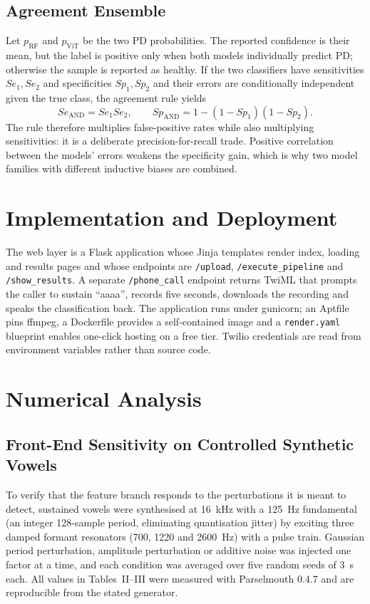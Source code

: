 \subsection{Agreement Ensemble}
Let $p_{\mathrm{RF}}$ and $p_{\mathrm{ViT}}$ be the two PD probabilities. The reported confidence is their mean, but the label is positive only when both models individually predict PD; otherwise the sample is reported as healthy. If the two classifiers have sensitivities $Se_1, Se_2$ and specificities $Sp_1, Sp_2$ and their errors are conditionally independent given the true class, the agreement rule yields
\begin{equation}
Se_{\mathrm{AND}} = Se_1 Se_2,\qquad Sp_{\mathrm{AND}} = 1-(1-Sp_1)(1-Sp_2).
\end{equation}
The rule therefore multiplies false-positive rates while also multiplying sensitivities: it is a deliberate precision-for-recall trade. Positive correlation between the models' errors weakens the specificity gain, which is why two model families with different inductive biases are combined.

\section{Implementation and Deployment}
The web layer is a Flask application whose Jinja templates render index, loading and results pages and whose endpoints are \texttt{/upload}, \texttt{/execute\_pipeline} and \texttt{/show\_results}. A separate \texttt{/phone\_call} endpoint returns TwiML that prompts the caller to sustain ``aaaa'', records five seconds, downloads the recording and speaks the classification back. The application runs under gunicorn; an Aptfile pins ffmpeg, a Dockerfile provides a self-contained image and a \texttt{render.yaml} blueprint enables one-click hosting on a free tier. Twilio credentials are read from environment variables rather than source code.

\section{Numerical Analysis}
\subsection{Front-End Sensitivity on Controlled Synthetic Vowels}
To verify that the feature branch responds to the perturbations it is meant to detect, sustained vowels were synthesised at 16~kHz with a 125~Hz fundamental (an integer 128-sample period, eliminating quantisation jitter) by exciting three damped formant resonators (700, 1220 and 2600~Hz) with a pulse train. Gaussian period perturbation, amplitude perturbation or additive noise was injected one factor at a time, and each condition was averaged over five random seeds of 3~s each. All values in Tables~II--III were measured with Parselmouth 0.4.7 and are reproducible from the stated generator.

